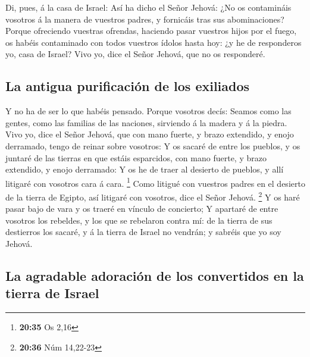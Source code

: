  Di, pues, á la casa de Israel: Así ha dicho el Señor
Jehová: ¿No os contamináis vosotros á la manera de vuestros padres, y
fornicáis tras sus abominaciones?  Porque ofreciendo
vuestras ofrendas, haciendo pasar vuestros hijos por el fuego, os habéis
contaminado con todos vuestros ídolos hasta hoy: ¿y he de responderos
yo, casa de Israel? Vivo yo, dice el Señor Jehová, que no os responderé.

\hypertarget{la-antigua-purificaciuxf3n-de-los-exiliados}{%
\subsection{La antigua purificación de los
exiliados}\label{la-antigua-purificaciuxf3n-de-los-exiliados}}

 Y no ha de ser lo que habéis pensado. Porque vosotros
decís: Seamos como las gentes, como las familias de las naciones,
sirviendo á la madera y á la piedra.  Vivo yo, dice el
Señor Jehová, que con mano fuerte, y brazo extendido, y enojo derramado,
tengo de reinar sobre vosotros:  Y os sacaré de entre los
pueblos, y os juntaré de las tierras en que estáis esparcidos, con mano
fuerte, y brazo extendido, y enojo derramado:  Y os he de
traer al desierto de pueblos, y allí litigaré con vosotros cara á cara.
\footnote{\textbf{20:35} Os 2,16}  Como litigué con
vuestros padres en el desierto de la tierra de Egipto, así litigaré con
vosotros, dice el Señor Jehová. \footnote{\textbf{20:36} Núm 14,22-23}
 Y os haré pasar bajo de vara y os traeré en vínculo de
concierto;  Y apartaré de entre vosotros los rebeldes, y
los que se rebelaron contra mí: de la tierra de sus destierros los
sacaré, y á la tierra de Israel no vendrán; y sabréis que yo soy Jehová.

\hypertarget{la-agradable-adoraciuxf3n-de-los-convertidos-en-la-tierra-de-israel}{%
\subsection{La agradable adoración de los convertidos en la tierra de
Israel}\label{la-agradable-adoraciuxf3n-de-los-convertidos-en-la-tierra-de-israel}}

